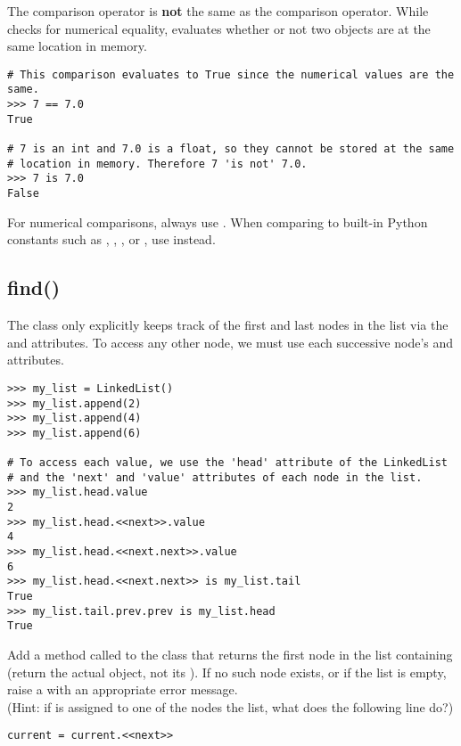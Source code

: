 \begin{warn} %
The  comparison operator is \textbf{not} the same as the \li{==} comparison operator.
While \li{==} checks for numerical equality,  evaluates whether or not two objects are at the same location in memory.

\begin{lstlisting}
# This comparison evaluates to True since the numerical values are the same.
>>> 7 == 7.0
True

# 7 is an int and 7.0 is a float, so they cannot be stored at the same
# location in memory. Therefore 7 'is not' 7.0.
>>> 7 is 7.0
False
\end{lstlisting}

For numerical comparisons, always use \li{==}.
When comparing to built-in Python constants such as , , , or , use  instead.
\end{warn}

\subsection*{find()} %

The  class only explicitly keeps track of the first and last nodes in the list via the  and  attributes.
To access any other node, we must use each successive node's  and  attributes.

\begin{lstlisting}
>>> my_list = LinkedList()
>>> my_list.append(2)
>>> my_list.append(4)
>>> my_list.append(6)

# To access each value, we use the 'head' attribute of the LinkedList
# and the 'next' and 'value' attributes of each node in the list.
>>> my_list.head.value
2
>>> my_list.head.<<next>>.value
4
>>> my_list.head.<<next.next>>.value
6
>>> my_list.head.<<next.next>> is my_list.tail
True
>>> my_list.tail.prev.prev is my_list.head
True
\end{lstlisting}

\begin{problem}
Add a method called  to the  class that
returns the first node in the list containing  (return the actual  object, not its ).
If no such node exists, or if the list is empty, raise a  with an appropriate error message.
\\
(Hint: if  is assigned to one of the nodes the list, what does the following line do?)
\begin{lstlisting}
current = current.<<next>>
\end{lstlisting}
\end{problem}

